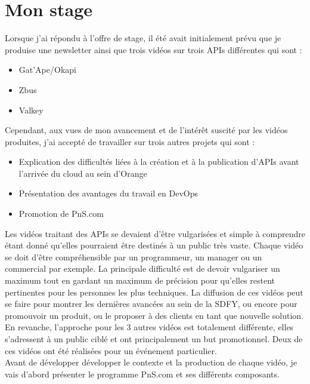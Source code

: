\chapter{Mon stage}
\label{sec:unchapitre}

Lorsque j'ai répondu à l'offre de stage, il été avait initialement prévu que je produise une newsletter ainsi que trois vidéos sur trois APIs différentes qui sont :

\begin{itemize}
    \item Gat'Ape/Okapi
    \item Zbus
    \item Valkey
\end{itemize}

Cependant, aux vues de mon avancement et de l'intérêt suscité par les vidéos produites, j'ai accepté de travailler sur trois autres projets qui sont :

\begin{itemize}
    \item Explication des difficultés liées à la création et à la publication d'APIs avant l'arrivée du cloud au sein d'Orange
    \item Présentation des avantages du travail en DevOps
    \item Promotion de PnS.com
\end{itemize}

Les vidéos traitant des APIs se devaient d'être vulgarisées et simple à comprendre étant donné qu'elles pourraient être destinés à un public très vaste. Chaque vidéo se doit d'être compréhensible par un programmeur, un manager ou un commercial par exemple. La principale difficulté est de devoir vulgariser un maximum tout en gardant un maximum de précision pour qu'elles restent pertinentes pour les personnes les plus techniques. La diffusion de ces vidéos peut se faire pour montrer les dernières avancées au sein de la SDFY, ou encore pour promouvoir un produit, ou le proposer à des clients en tant que nouvelle solution. \\

En revanche, l'approche pour les 3 autres vidéos est totalement différente, elles s'adressent à un public ciblé et ont principalement un but promotionnel. Deux de ces vidéos ont été réalisées pour un événement particulier. \\

Avant de développer développer le contexte et la production de chaque vidéo, je vais d'abord présenter le programme PnS.com et ses différents composants. 


